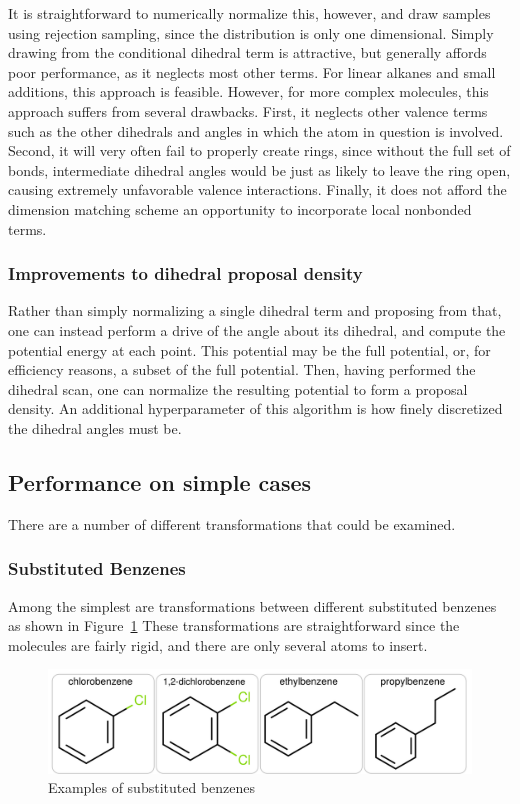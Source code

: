 %
It is straightforward to numerically normalize this, however, and draw samples using rejection sampling, since the distribution is only one dimensional.
%
Simply drawing from the conditional dihedral term is attractive, but generally affords poor performance, as it neglects most other terms.
%
For linear alkanes and small additions, this approach is feasible.
%
However, for more complex molecules, this approach suffers from several drawbacks. 
%
First, it neglects other valence terms such as the other dihedrals and angles in which the atom in question is involved.
%
Second, it will very often fail to properly create rings, since without the full set of bonds, intermediate dihedral angles would be just as likely to leave the ring open, causing extremely unfavorable valence interactions.
%
Finally, it does not afford the dimension matching scheme an opportunity to incorporate local nonbonded terms.
%
\subsubsection{Improvements to dihedral proposal density}
%
Rather than simply normalizing a single dihedral term and proposing from that, one can instead perform a drive of the angle about its dihedral, and compute the potential energy at each point.
%
This potential may be the full potential, or, for efficiency reasons, a subset of the full potential.
%
Then, having performed the dihedral scan, one can normalize the resulting potential to form a proposal density.
%
An additional hyperparameter of this algorithm is how finely discretized the dihedral angles must be.
%
\subsection{Performance on simple cases}
%
There are a number of different transformations that could be examined.
%
\subsubsection{Substituted Benzenes}
%
Among the simplest are transformations between different substituted benzenes as shown in Figure~\ref{fig:sub_benz}
%
These transformations are straightforward since the molecules are fairly rigid, and there are only several atoms to insert.
%
\begin{figure}
    \centering
    \includegraphics[width=1.0\textwidth]{subs_benz.png}
    \caption{Examples of substituted benzenes}
    \label{fig:sub_benz}
\end{figure}
%
